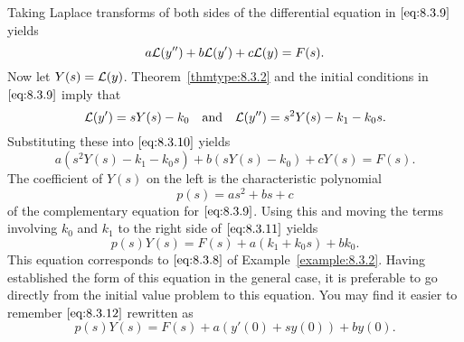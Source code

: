 \documentclass{ximera}
\begin{document}
Taking Laplace transforms of both sides of  the differential
equation in $\eqref{eq:8.3.9}$ yields
\begin{equation}\label{eq:8.3.10}
a{\cal L}(y'')+b{\cal L}(y')+c{\cal L}(y)=F(s).
\end{equation}
Now let $Y(s)={\cal L}(y)$.  Theorem~\ref{thmtype:8.3.2} and the
initial conditions in $\eqref{eq:8.3.9}$ imply that
$$
{\cal L}(y')=sY(s)-k_0\quad\mbox{and}\quad {\cal L}(y'')=s^2Y(s)-k_1-k_0s.
$$
Substituting these  into  $\eqref{eq:8.3.10}$ yields
\begin{equation}\label{eq:8.3.11}
a\left(s^2Y(s)-k_1-k_0s\right)+b\left(sY(s)-k_0\right)+cY(s)=F(s).
\end{equation}
The coefficient of $Y(s)$ on the left is the characteristic
polynomial
$$
p(s)=as^2+bs+c
$$
of the complementary equation for $\eqref{eq:8.3.9}$. Using this and moving
the terms involving $k_0$ and $k_1$ to the right side of $\eqref{eq:8.3.11}$
yields
\begin{equation}\label{eq:8.3.12}
p(s)Y(s)=F(s)+a(k_1+k_0s)+bk_0.
\end{equation}
This equation corresponds to $\eqref{eq:8.3.8}$ of Example~\ref{example:8.3.2}.
Having established the form of this equation in the general case, it
is preferable to go directly from the initial value problem to this
equation. You may find it easier to remember $\eqref{eq:8.3.12}$ rewritten as
\begin{equation} \label{eq:8.3.13}
p(s)Y(s)=F(s)+a\left(y'(0)+sy(0)\right)+by(0).
\end{equation}
\end{document}
